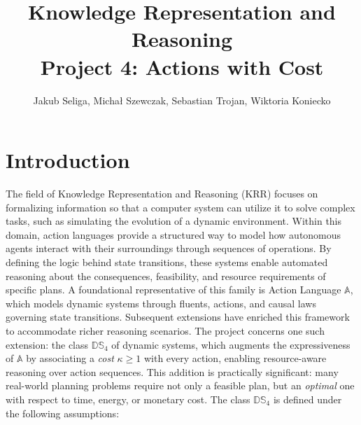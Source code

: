 \documentclass[11pt]{article}
\title{Knowledge Representation and Reasoning \\ Project 4: Actions with Cost}
\author{Jakub Seliga, Michał Szewczak, Sebastian Trojan, Wiktoria Koniecko}
\date{}
\begin{document}
\maketitle

\section*{Introduction}

The field of Knowledge Representation and Reasoning (KRR) focuses on formalizing information so that a computer system can utilize it to solve complex tasks, such as simulating the evolution of a dynamic environment. Within this domain, action languages provide a structured way to model how autonomous agents interact with their surroundings through sequences of operations. By defining the logic behind state transitions, these systems enable automated reasoning about the consequences, feasibility, and resource requirements of specific plans.
A foundational representative of this family is Action Language
$\mathbb{A}$, which models dynamic systems
through fluents, actions, and causal laws governing state transitions.
Subsequent extensions have enriched this framework to accommodate
richer reasoning scenarios. The project concerns one such
extension: the class $\mathbb{DS}_{4}$ of dynamic systems, which
augments the expressiveness of $\mathbb{A}$ by associating a
\textit{cost} $\kappa \geq 1$ with every action, enabling
resource-aware reasoning over action sequences. This addition is
practically significant: many real-world planning problems require
not only a feasible plan, but an \textit{optimal} one with respect
to time, energy, or monetary cost.
The class $\mathbb{DS}_{4}$ is defined under the following
assumptions:
\end{document}
